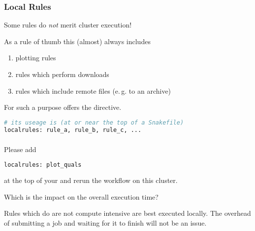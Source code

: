\begin{frame}[fragile]
  \frametitle{Local Rules}
  \begin{hint}[]
  	Some rules do \emph{not} merit cluster execution!
  \end{hint}
  \pause
  As a rule of thumb this (almost) always includes
  \begin{enumerate}
   \item plotting rules
   \item rules which perform downloads
   \item rules which include remote files (e.\,g. to an archive)
  \end{enumerate}
  \pause
  For such a purpose \Snakemake{} offers the  directive.
  \begin{lstlisting}[language=Python,style=Python]
# its useage is (at or near the top of a Snakefile)
localrules: rule_a, rule_b, rule_c, ...
  \end{lstlisting}

\end{frame}

\begin{frame}[fragile]
  \frametitle{}
  Please add
  \begin{lstlisting}[language=Python,style=Python]
localrules: plot_quals
  \end{lstlisting}
  at the top of your \Snakemake{} and rerun the workflow on this cluster.
  \pause
  \begin{question}
  	Which is the impact on the overall execution time?
  \end{question}
  \pause
  \begin{hint}
  	Rules which do are not compute intensive are best executed locally. The overhead of submitting a job and waiting for it to finish will not be an issue.
  \end{hint}
\end{frame}

